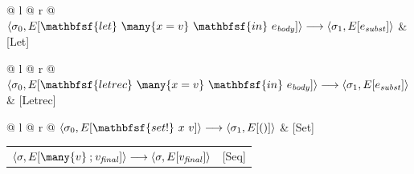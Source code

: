 \noindent
\begin{tabular*}{\linewidth}{@{} l @{\extracolsep{\fill}} r @{}}
$\langle \sigma_0, E[\mathbfsf{let}\ \many{x = v}\ \mathbfsf{in}\ e_{\mathit{body}}] \rangle \longrightarrow \langle \sigma_1, E[e_{\mathit{subst}}] \rangle$ & [Let] \\
\end{tabular*}\vspace{1em}

\noindent
\begin{tabular*}{\linewidth}{@{} l @{\extracolsep{\fill}} r @{}}
$\langle \sigma_0, E[\mathbfsf{letrec}\ \many{x = v}\ \mathbfsf{in}\ e_{\mathit{body}}] \rangle \longrightarrow \langle \sigma_1, E[e_{\mathit{subst}}] \rangle$ & [Letrec] \\
\end{tabular*}\vspace{1em}

\noindent
\begin{tabular*}{\linewidth}{@{} l @{\extracolsep{\fill}} r @{}}
$\langle \sigma_0, E[\mathbfsf{set!}\ x\ v] \rangle \longrightarrow \langle \sigma_1, E[()] \rangle$ & [Set] \\
\end{tabular*}\vspace{1em}

\noindent
\begin{tabular*}{\linewidth}{@{} l @{\extracolsep{\fill}} r @{}}
$\langle \sigma, E[\many{v} \mathbin{;} v_{\mathit{final}}] \rangle \longrightarrow \langle \sigma, E[v_{\mathit{final}}] \rangle$ & [Seq]
\end{tabular*}\vspace{1em}

